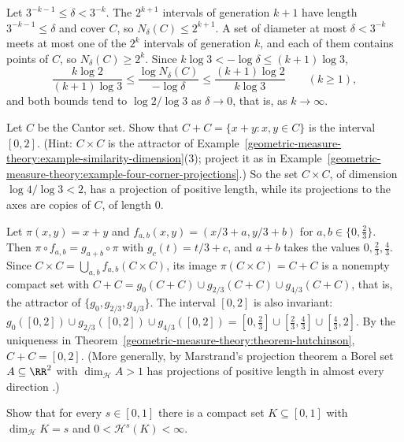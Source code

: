 \begin{solution}
Let $3^{-k-1} \leq \delta < 3^{-k}$. The $2^{k+1}$ intervals of generation $k + 1$ have length $3^{-k-1} \leq \delta$ and cover $C$, so $N_\delta(C) \leq 2^{k+1}$. A set of diameter at most $\delta < 3^{-k}$
meets at most one of the $2^k$ intervals of generation $k$, and each of them contains points of $C$, so $N_\delta(C) \geq 2^k$. Since $k\log 3 < -\log\delta \leq (k + 1)\log 3$,
\[
\frac{k\log 2}{(k + 1)\log 3} \leq \frac{\log N_\delta(C)}{-\log\delta} \leq \frac{(k + 1)\log 2}{k\log 3} \qquad (k \geq 1),
\]
and both bounds tend to $\log 2/\log 3$ as $\delta \to 0$, that is, as $k \to \infty$.
\end{solution}

\begin{exercise}\label{geometric-measure-theory:exercise-cantor-sum}
Let $C$ be the Cantor set. Show that $C + C = \{x + y : x, y \in C\}$ is the interval $[0, 2]$. (Hint: $C \times C$ is the attractor of
Example~\ref{geometric-measure-theory:example-similarity-dimension}(3); project it as in Example~\ref{geometric-measure-theory:example-four-corner-projections}.) So the set $C \times C$, of dimension $\log 4/\log 3 < 2$, has a
projection of positive length, while its projections to the axes are copies of $C$, of length $0$.
\end{exercise}

\begin{solution}
Let $\pi(x, y) = x + y$ and $f_{a, b}(x, y) = (x/3 + a, y/3 + b)$ for $a, b \in \{0, \frac23\}$. Then $\pi \circ f_{a, b} = g_{a + b} \circ \pi$ with $g_c(t) = t/3 + c$, and $a + b$ takes the values
$0, \frac23, \frac43$. Since $C \times C = \bigcup_{a, b}f_{a, b}(C \times C)$, its image $\pi(C \times C) = C + C$ is a nonempty compact set with $C + C = g_0(C + C) \cup g_{2/3}(C + C) \cup g_{4/3}(C + C)$,
that is, the attractor of $\{g_0, g_{2/3}, g_{4/3}\}$. The interval $[0, 2]$ is also invariant: $g_0([0, 2]) \cup g_{2/3}([0, 2]) \cup g_{4/3}([0, 2]) = [0, \frac23] \cup [\frac23, \frac43] \cup [\frac43, 2]$. By
the uniqueness in Theorem~\ref{geometric-measure-theory:theorem-hutchinson}, $C + C = [0, 2]$. (More generally, by Marstrand's projection theorem a Borel set $A \subseteq \RR^2$ with $\dim_{\mathcal{H}}A > 1$ has
projections of positive length in almost every direction \cite{mattila-1995}.)
\end{solution}

\begin{exercise}\label{geometric-measure-theory:exercise-prescribed-dimension}
Show that for every $s \in [0, 1]$ there is a compact set $K \subseteq [0, 1]$ with $\dim_{\mathcal{H}}K = s$ and $0 < \mathcal{H}^s(K) < \infty$.
\end{exercise}

